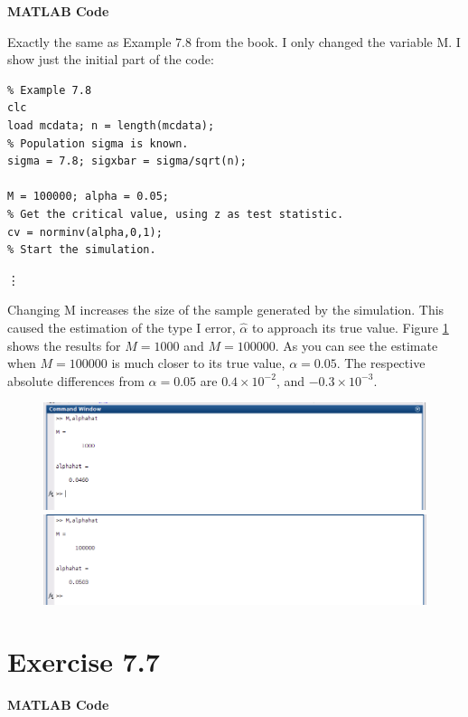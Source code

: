 \documentclass[12pt,a4paper]{article}
\begin{document}
\textbf{MATLAB Code}

Exactly the same as Example 7.8 from the book. I only changed the variable M. I show just the initial part of the code:

\begin{verbatim}
% Example 7.8
clc
load mcdata; n = length(mcdata);  								
% Population sigma is known.
sigma = 7.8; sigxbar = sigma/sqrt(n);

M = 100000; alpha = 0.05;
% Get the critical value, using z as test statistic.
cv = norminv(alpha,0,1);
% Start the simulation.
\end{verbatim}
\vdots

Changing M increases the size of the sample generated by the simulation. This caused the estimation of the type I error, $\hat{\alpha}$ to approach its true value. Figure \ref{q7p6 fig1} shows the results for $M=1000$ and $M=100000$. As you can see the estimate when $M=100000$ is much closer to its true value, $\alpha=0.05$. The respective absolute differences from $\alpha=0.05$ are $0.4\times10^{-2}$, and $-0.3\times10^{-3}$.

\begin{figure}[ht!]
\begin{center}
\includegraphics[scale=.5]{q7p6_result1.png}
\includegraphics[scale=.5]{q7p6_result2.png}
\caption{}
\label{q7p6 fig1}
\end{center}
\end{figure}
\FloatBarrier

\section*{Exercise 7.7}

\textbf{MATLAB Code}
\end{document}
